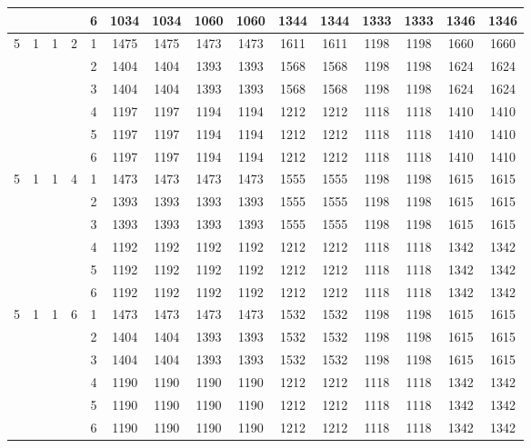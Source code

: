 \begin{longtable}{|c|c|c|c|c|c c|c c|c c|c c|c c|}
 & & & & 6 & 1034 & 1034 & 1060 & 1060 & 1344 & 1344 & 1333 & 1333 & 1346 & 1346 \\
\hline
\multirow{6}{*}{5} & \multirow{6}{*}{1} & \multirow{6}{*}{1} & \multirow{6}{*}{2} & 1 & 1475 & 1475 & 1473 & 1473 & 1611 & 1611 & 1198 & 1198 & 1660 & 1660 \\
 & & & & 2 & 1404 & 1404 & 1393 & 1393 & 1568 & 1568 & 1198 & 1198 & 1624 & 1624 \\
 & & & & 3 & 1404 & 1404 & 1393 & 1393 & 1568 & 1568 & 1198 & 1198 & 1624 & 1624 \\
 & & & & 4 & 1197 & 1197 & 1194 & 1194 & 1212 & 1212 & 1118 & 1118 & 1410 & 1410 \\
 & & & & 5 & 1197 & 1197 & 1194 & 1194 & 1212 & 1212 & 1118 & 1118 & 1410 & 1410 \\
 & & & & 6 & 1197 & 1197 & 1194 & 1194 & 1212 & 1212 & 1118 & 1118 & 1410 & 1410 \\
\hline
\multirow{6}{*}{5} & \multirow{6}{*}{1} & \multirow{6}{*}{1} & \multirow{6}{*}{4} & 1 & 1473 & 1473 & 1473 & 1473 & 1555 & 1555 & 1198 & 1198 & 1615 & 1615 \\
 & & & & 2 & 1393 & 1393 & 1393 & 1393 & 1555 & 1555 & 1198 & 1198 & 1615 & 1615 \\
 & & & & 3 & 1393 & 1393 & 1393 & 1393 & 1555 & 1555 & 1198 & 1198 & 1615 & 1615 \\
 & & & & 4 & 1192 & 1192 & 1192 & 1192 & 1212 & 1212 & 1118 & 1118 & 1342 & 1342 \\
 & & & & 5 & 1192 & 1192 & 1192 & 1192 & 1212 & 1212 & 1118 & 1118 & 1342 & 1342 \\
 & & & & 6 & 1192 & 1192 & 1192 & 1192 & 1212 & 1212 & 1118 & 1118 & 1342 & 1342 \\
\hline
\multirow{6}{*}{5} & \multirow{6}{*}{1} & \multirow{6}{*}{1} & \multirow{6}{*}{6} & 1 & 1473 & 1473 & 1473 & 1473 & 1532 & 1532 & 1198 & 1198 & 1615 & 1615 \\
 & & & & 2 & 1404 & 1404 & 1393 & 1393 & 1532 & 1532 & 1198 & 1198 & 1615 & 1615 \\
 & & & & 3 & 1404 & 1404 & 1393 & 1393 & 1532 & 1532 & 1198 & 1198 & 1615 & 1615 \\
 & & & & 4 & 1190 & 1190 & 1190 & 1190 & 1212 & 1212 & 1118 & 1118 & 1342 & 1342 \\
 & & & & 5 & 1190 & 1190 & 1190 & 1190 & 1212 & 1212 & 1118 & 1118 & 1342 & 1342 \\
 & & & & 6 & 1190 & 1190 & 1190 & 1190 & 1212 & 1212 & 1118 & 1118 & 1342 & 1342 \\

\end{longtable}
